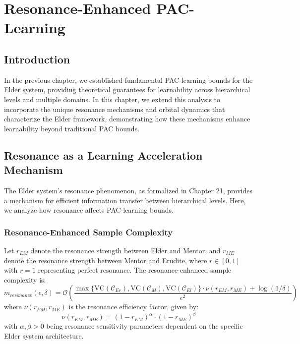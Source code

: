 \chapter{Resonance-Enhanced PAC-Learning}

\section{Introduction}

In the previous chapter, we established fundamental PAC-learning bounds for the Elder system, providing theoretical guarantees for learnability across hierarchical levels and multiple domains. In this chapter, we extend this analysis to incorporate the unique resonance mechanisms and orbital dynamics that characterize the Elder framework, demonstrating how these mechanisms enhance learnability beyond traditional PAC bounds.

\section{Resonance as a Learning Acceleration Mechanism}

The Elder system's resonance phenomenon, as formalized in Chapter 21, provides a mechanism for efficient information transfer between hierarchical levels. Here, we analyze how resonance affects PAC-learning bounds.



\subsection{Resonance-Enhanced Sample Complexity}

\begin{theorem}
Let $r_{EM}$ denote the resonance strength between Elder and Mentor, and $r_{ME}$ denote the resonance strength between Mentor and Erudite, where $r \in [0, 1]$ with $r = 1$ representing perfect resonance. The resonance-enhanced sample complexity is:
\begin{equation}
m_{resonance}(\epsilon, \delta) = \mathcal{O}\left(\frac{\max\{\text{VC}(\mathcal{C}_{Er}), \text{VC}(\mathcal{C}_{M}), \text{VC}(\mathcal{C}_{El})\} \cdot \nu(r_{EM}, r_{ME}) + \log(1/\delta)}{\epsilon^2}\right)
\end{equation}
where $\nu(r_{EM}, r_{ME})$ is the resonance efficiency factor, given by:
\begin{equation}
\nu(r_{EM}, r_{ME}) = (1 - r_{EM})^{\alpha} \cdot (1 - r_{ME})^{\beta}
\end{equation}
with $\alpha, \beta > 0$ being resonance sensitivity parameters dependent on the specific Elder system architecture.
\end{theorem}

